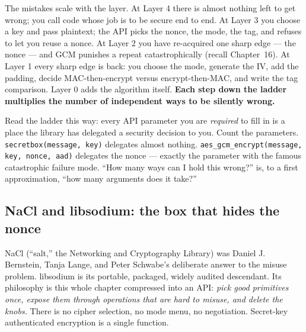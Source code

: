 The mistakes scale with the layer. At Layer 4 there is almost nothing left to get
wrong; you call code whose job is to be secure end to end. At Layer 3 you choose a
key and pass plaintext; the API picks the nonce, the mode, the tag, and refuses to
let you reuse a nonce. At Layer 2 you have re-acquired one sharp edge --- the nonce
--- and GCM punishes a repeat catastrophically (recall Chapter~16). At Layer 1 every sharp edge is back: you choose the mode, generate the
IV, add the padding, decide MAC-then-encrypt versus encrypt-then-MAC, and write the
tag comparison. Layer 0 adds the algorithm itself. \textbf{Each step down the
ladder multiplies the number of independent ways to be silently wrong.}

\begin{intuitionbox}
Read the ladder this way: every API parameter you are \emph{required} to fill in is
a place the library has delegated a security decision to you. Count the parameters.
\texttt{secretbox(message, key)} delegates almost nothing.
\texttt{aes\_gcm\_encrypt(message, key, nonce, aad)} delegates the nonce ---
exactly the parameter with the famous catastrophic failure mode. ``How many ways
can I hold this wrong?'' is, to a first approximation, ``how many arguments does it
take?''
\end{intuitionbox}

\subsection{NaCl and libsodium: the box that hides the nonce}

NaCl (``salt,'' the Networking and Cryptography Library) was Daniel J. Bernstein,
Tanja Lange, and Peter Schwabe's deliberate answer to the misuse problem.
libsodium is its portable, packaged, widely audited descendant. Its philosophy is
this whole chapter compressed into an API: \emph{pick good primitives once, expose
them through operations that are hard to misuse, and delete the knobs.} There is no
cipher selection, no mode menu, no negotiation. Secret-key authenticated encryption
is a single function.

